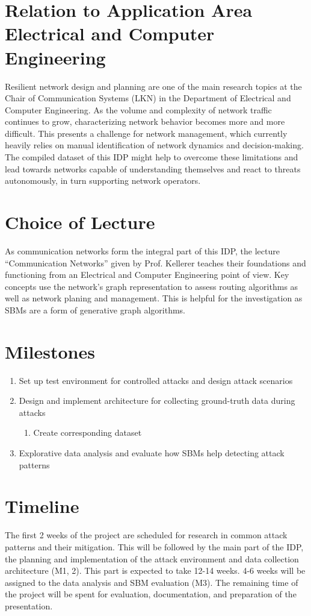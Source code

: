 \documentclass[paper=a4]{scrartcl}
\begin{document}
\section{Relation to Application Area Electrical and Computer Engineering}
Resilient network design and planning are one of the main research topics at the
Chair of Communication Systems (LKN) in the Department of Electrical and
Computer Engineering. As the volume and complexity of network traffic continues
to grow, characterizing network behavior becomes more and more difficult. This
presents a challenge for network management, which currently heavily relies on
manual identification of network dynamics and decision-making. The compiled
dataset of this IDP might help to overcome these limitations and lead
towards networks capable of understanding themselves and react to threats
autonomously, in turn supporting network operators.

\section{Choice of Lecture}
As communication networks form the integral part of this IDP, the lecture
``Communication Networks'' given by Prof. Kellerer teaches their foundations and
functioning from an Electrical and Computer Engineering point of view. Key
concepts use the network's graph representation to assess routing algorithms as
well as network planing and management. This is helpful for the investigation as
SBMs are a form of generative graph algorithms.

\section{Milestones}
\begin{enumerate}
    \item Set up test environment for controlled attacks and design attack
    scenarios
    \item Design and implement architecture for collecting ground-truth data
    during attacks
    \begin{enumerate}
        \item[2.5.] Create corresponding dataset
    \end{enumerate}
    \item Explorative data analysis and evaluate how SBMs help detecting attack
    patterns
\end{enumerate}

\section{Timeline}
The first 2 weeks of the project are scheduled for research in common attack
patterns and their mitigation. This will be followed by the main part of the
IDP, the planning and implementation of the attack environment and data
collection architecture (M1, 2). This part is expected to take 12-14 weeks.
4-6 weeks will be assigned to the data analysis and SBM evaluation (M3). The
remaining time of the project will be spent for evaluation, documentation, and
preparation of the presentation.
\end{document}
